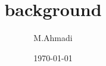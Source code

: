 \documentclass{beamer}
\title{background}
\author{M.Ahmadi}
\date{\today}
\begin{document}
\begin{frame}
\titlepage 
\end{frame}
\end{document}

